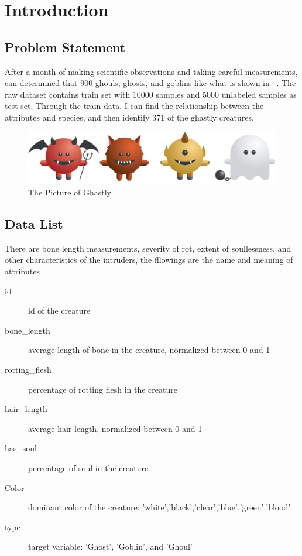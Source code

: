 
\section{Introduction}\label{sec-intro}

\subsection{Problem Statement}


After a month of making scientific observations 
and taking careful measurements, 
can determined that 900 ghouls, ghosts, and goblins
like what is shown in~  .
The raw dataset contains train set with 10000 %
samples and 5000 unlabeled samples as test set.
Through the train data, I can find the relationship
between the attributes and species, and then identify 371 of the ghastly creatures.


\begin{figure}[htbp]
	\centering
	\includegraphics[scale=0.3]{figures/bar.eps}
	\caption{The Picture of Ghastly}\label{fig:animal}
\end{figure}


\subsection{Data List}


There are bone length measurements, 
severity of rot, extent of soullessness, 
and other characteristics of the intruders,
the fllowings are the  
name and meaning of attributes


\begin{description}
	\item[id] id of the creature
	\item[bone_length] average length of bone in the creature, normalized between 0 and 1
	\item[rotting_flesh] percentage of rotting flesh in the creature
	\item[hair_length] average hair length, normalized between 0 and 1
	\item[has_soul] percentage of soul in the creature
	\item[Color] dominant color of the creature: 'white','black','clear','blue','green','blood'
	\item[type] target variable: 'Ghost', 'Goblin', and 'Ghoul'
\end{description}


